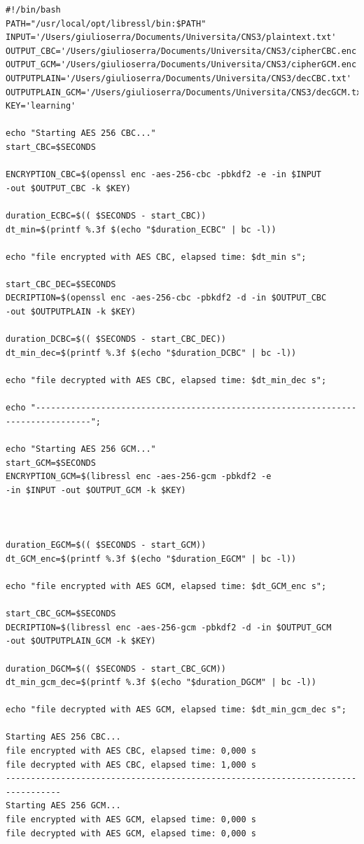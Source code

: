 \documentclass{article}
\begin{document}
\begin{verbatim}
#!/bin/bash
PATH="/usr/local/opt/libressl/bin:$PATH"
INPUT='/Users/giulioserra/Documents/Universita/CNS3/plaintext.txt'
OUTPUT_CBC='/Users/giulioserra/Documents/Universita/CNS3/cipherCBC.enc'
OUTPUT_GCM='/Users/giulioserra/Documents/Universita/CNS3/cipherGCM.enc'
OUTPUTPLAIN='/Users/giulioserra/Documents/Universita/CNS3/decCBC.txt'
OUTPUTPLAIN_GCM='/Users/giulioserra/Documents/Universita/CNS3/decGCM.txt'
KEY='learning'

echo "Starting AES 256 CBC..."
start_CBC=$SECONDS

ENCRYPTION_CBC=$(openssl enc -aes-256-cbc -pbkdf2 -e -in $INPUT 
-out $OUTPUT_CBC -k $KEY)

duration_ECBC=$(( $SECONDS - start_CBC))
dt_min=$(printf %.3f $(echo "$duration_ECBC" | bc -l))

echo "file encrypted with AES CBC, elapsed time: $dt_min s"; 

start_CBC_DEC=$SECONDS
DECRIPTION=$(openssl enc -aes-256-cbc -pbkdf2 -d -in $OUTPUT_CBC 
-out $OUTPUTPLAIN -k $KEY)

duration_DCBC=$(( $SECONDS - start_CBC_DEC))
dt_min_dec=$(printf %.3f $(echo "$duration_DCBC" | bc -l))

echo "file decrypted with AES CBC, elapsed time: $dt_min_dec s"; 

echo "---------------------------------------------------------------------------------"; 

echo "Starting AES 256 GCM..."
start_GCM=$SECONDS
ENCRYPTION_GCM=$(libressl enc -aes-256-gcm -pbkdf2 -e 
-in $INPUT -out $OUTPUT_GCM -k $KEY)



duration_EGCM=$(( $SECONDS - start_GCM))
dt_GCM_enc=$(printf %.3f $(echo "$duration_EGCM" | bc -l))

echo "file encrypted with AES GCM, elapsed time: $dt_GCM_enc s"; 

start_CBC_GCM=$SECONDS
DECRIPTION=$(libressl enc -aes-256-gcm -pbkdf2 -d -in $OUTPUT_GCM 
-out $OUTPUTPLAIN_GCM -k $KEY)

duration_DGCM=$(( $SECONDS - start_CBC_GCM))
dt_min_gcm_dec=$(printf %.3f $(echo "$duration_DGCM" | bc -l))

echo "file decrypted with AES GCM, elapsed time: $dt_min_gcm_dec s"; 

Starting AES 256 CBC...
file encrypted with AES CBC, elapsed time: 0,000 s
file decrypted with AES CBC, elapsed time: 1,000 s
---------------------------------------------------------------------------------
Starting AES 256 GCM...
file encrypted with AES GCM, elapsed time: 0,000 s
file decrypted with AES GCM, elapsed time: 0,000 s
\end{verbatim}
\end{document}
